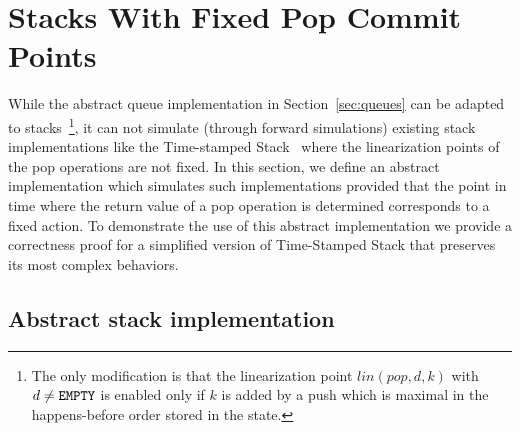 \section{Stacks With Fixed Pop Commit Points}\label{sec:stacks}

While the abstract queue implementation in Section~\ref{sec:queues} can be adapted to stacks~\footnote{The only modification is that the linearization point $lin(pop,d,k)$ with $d\neq{\tt EMPTY}$ is enabled only if $k$ is added by a push which is maximal in the happens-before order stored in the state.}, it can not simulate (through forward simulations) existing stack implementations like the Time-stamped Stack~\cite{DBLP:conf/popl/DoddsHK15} where the linearization points of the pop operations are not fixed. In this section, we define an abstract implementation which simulates such implementations provided that the point in time where the return value of a pop operation is determined corresponds to a fixed action. To demonstrate the use of this abstract implementation we provide a correctness proof for a simplified version of Time-Stamped Stack that preserves its most complex behaviors.

\subsection{Abstract stack implementation}


